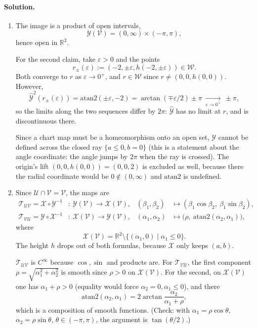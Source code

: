 \documentclass[11pt]{article}
\begin{document}
\paragraph{Solution.}
\begin{enumerate}[label=(\alph*)]
\item The image is a product of open intervals,
\[
\mathcal Y(\mathcal V)=(0,\infty)\times(-\pi,\pi),
\]
hence open in $\mathbb R^2$.

For the second claim, take $\varepsilon>0$ and the points
\[
r_\pm(\varepsilon):=(-2,\pm\varepsilon,h(-2,\pm\varepsilon))\in\mathcal W.
\]
Both converge to $r$ as $\varepsilon\to0^+$, and $r\in\mathcal W$ since $r\neq(0,0,h(0,0))$. However,
\[
\widehat{\mathcal Y}^2(r_\pm(\varepsilon))=\mathrm{atan2}(\pm\varepsilon,-2)=\arctan(\mp\varepsilon/2)\pm\pi\ \xrightarrow[\varepsilon\to0^+]{}\ \pm\pi,
\]
so the limits along the two sequences differ by $2\pi$: $\widehat{\mathcal Y}$ has no limit at $r$, and is discontinuous there.

Since a chart map must be a homeomorphism onto an open set, $\mathcal Y$ cannot be defined across the closed ray $\{a\le0,b=0\}$ (this is a
statement about the angle coordinate: the angle jumps by $2\pi$ when the ray is crossed). The origin's lift
$(0,0,h(0,0))=(0,0,2)$ is excluded as well, because there the radial coordinate would be $0\notin(0,\infty)$ and $\mathrm{atan2}$ is undefined.
\item Since $\mathcal U\cap\mathcal V=\mathcal V$, the maps are
\begin{align*}
\mathcal T_{\mathcal{UV}}=\mathcal X\circ\mathcal Y^{-1}&:\ \mathcal Y(\mathcal V)\to\mathcal X(\mathcal V),& (\beta_1,\beta_2)&\mapsto(\beta_1\cos\beta_2,\ \beta_1\sin\beta_2),\\
\mathcal T_{\mathcal{VU}}=\mathcal Y\circ\mathcal X^{-1}&:\ \mathcal X(\mathcal V)\to\mathcal Y(\mathcal V),& (\alpha_1,\alpha_2)&\mapsto\bigl(\rho,\ \mathrm{atan2}(\alpha_2,\alpha_1)\bigr),
\end{align*}
where
\[
\mathcal X(\mathcal V)=\mathbb R^2\setminus\{(\alpha_1,0)\mid\alpha_1\le0\}.
\]
The height $h$ drops out of both formulas, because $\mathcal X$ only keeps $(a,b)$.

$\mathcal T_{\mathcal{UV}}$ is $C^\infty$ because $\cos,\sin$ and products are. For $\mathcal T_{\mathcal{VU}}$, the first component
$\rho=\sqrt{\alpha_1^2+\alpha_2^2}$ is smooth since $\rho>0$ on $\mathcal X(\mathcal V)$. For the second, on $\mathcal X(\mathcal V)$ one has $\alpha_1+\rho>0$
(equality would force $\alpha_2=0,\alpha_1\le0$), and there
\[
\mathrm{atan2}(\alpha_2,\alpha_1)=2\arctan\frac{\alpha_2}{\alpha_1+\rho},
\]
which is a composition of smooth functions. (Check: with $\alpha_1=\rho\cos\theta$, $\alpha_2=\rho\sin\theta$, $\theta\in(-\pi,\pi)$, the argument is $\tan(\theta/2)$.)


\end{enumerate}
\end{document}

